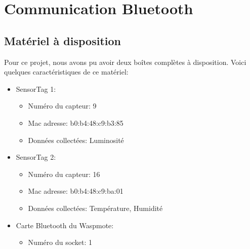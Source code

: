 \newpage
\section{Communication Bluetooth}
\subsection{Matériel à disposition}
Pour ce projet, nous avons pu avoir deux boîtes complètes à disposition. Voici quelques caractéristiques de ce matériel:
\begin{itemize}
	\item SensorTag 1:
	\begin{itemize}
		\item Numéro du capteur: 9
		\item Mac adresse: b0:b4:48:c9:b3:85
		\item Données collectées: Luminosité 
	\end{itemize}
	\item SensorTag 2:
	\begin{itemize}
		\item Numéro du capteur: 16
		\item Mac adresse: b0:b4:48:c9:ba:01
		\item Données collectées: Température, Humidité 
	\end{itemize}
	\item Carte Bluetooth du Waspmote:
	\begin{itemize}
		\item Numéro du socket: 1
	\end{itemize}
\end{itemize}
